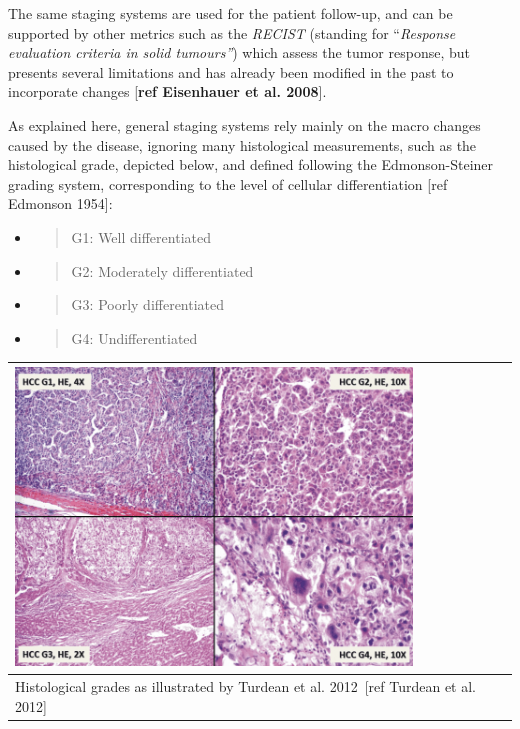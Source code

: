 \documentclass[]{article}
\begin{document}
The same staging systems are used for the patient follow-up, and can be
supported by other metrics such as the \emph{RECIST} (standing for
``\emph{Response evaluation criteria in solid tumours''}) which assess
the tumor response, but presents several limitations and has already
been modified in the past to incorporate changes {[}\textbf{ref
Eisenhauer et al. 2008}{]}.

As explained here, general staging systems rely mainly on the macro
changes caused by the disease, ignoring many histological measurements,
such as the histological grade, depicted below, and defined following
the Edmonson-Steiner grading system, corresponding to the level of
cellular differentiation {[}ref Edmonson 1954{]}:

\begin{itemize}
\item
  \begin{quote}
  G1: Well differentiated
  \end{quote}
\item
  \begin{quote}
  G2: Moderately differentiated
  \end{quote}
\item
  \begin{quote}
  G3: Poorly differentiated
  \end{quote}
\item
  \begin{quote}
  G4: Undifferentiated
  \end{quote}
\end{itemize}

\begin{longtable}[c]{@{}l@{}}
\toprule
\includegraphics[width=4.14503in,height=3.11935in]{./images/media/image11.png}\tabularnewline
\midrule
\endhead
Histological grades as illustrated by Turdean et al. 2012~{[}ref Turdean
et al. 2012{]}\tabularnewline
\bottomrule
\end{longtable}
\end{document}
